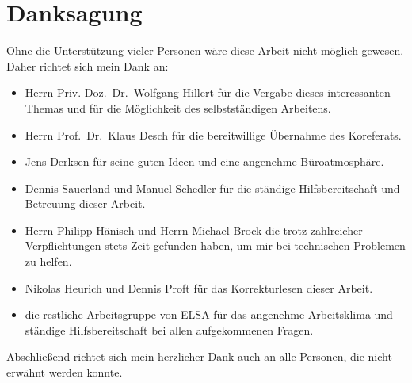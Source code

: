 \chapter*{Danksagung}
\label{sec:danksagung}
Ohne die Unterstützung vieler Personen wäre diese Arbeit nicht möglich gewesen.
Daher richtet sich mein Dank an:
\begin{itemize}
	\item Herrn Priv.-Doz.\ Dr.\ Wolfgang Hillert für die Vergabe dieses interessanten Themas und für die Möglichkeit des selbstständigen Arbeitens.
	
	\item Herrn Prof.\ Dr.\ Klaus Desch für die bereitwillige Übernahme des Koreferats.
	
	\item Jens Derksen für seine guten Ideen und eine angenehme Büroatmosphäre.
	
	\item Dennis Sauerland und Manuel Schedler für die ständige Hilfsbereitschaft und Betreuung dieser Arbeit.
	
	\item Herrn Philipp Hänisch und Herrn Michael Brock die trotz zahlreicher Verpflichtungen stets Zeit gefunden haben, um mir bei technischen Problemen zu helfen.
	
	\item Nikolas Heurich und Dennis Proft für das Korrekturlesen dieser Arbeit.
	
	\item die restliche Arbeitsgruppe von ELSA für das angenehme Arbeitsklima und ständige Hilfsbereitschaft bei allen aufgekommenen Fragen.
\end{itemize}
Abschließend richtet sich mein herzlicher Dank auch an alle Personen, die nicht erwähnt werden konnte.